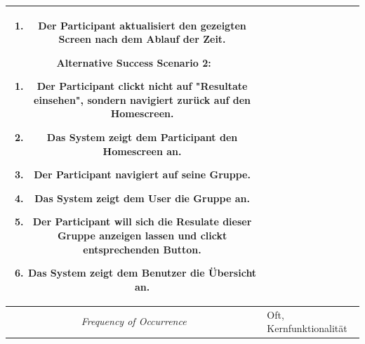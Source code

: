 \begin{center}
\begin{longtable}{| c | p{7cm} |}
\begin{enumerate}[label=1.\alph*,noitemsep]
			\item Der Participant aktualisiert den gezeigten Screen nach dem Ablauf der Zeit.
		\end{enumerate}
		Alternative Success Scenario 2:
		\begin{enumerate}[label=4.\alph*,noitemsep]
			\item Der Participant clickt nicht auf "Resultate einsehen", sondern navigiert zurück auf den Homescreen.
			\item Das System zeigt dem Participant den Homescreen an.
			\item Der Participant navigiert auf seine Gruppe.
			\item Das System zeigt dem User die Gruppe an.
			\item Der Participant will sich die Resulate dieser Gruppe anzeigen lassen und clickt entsprechenden Button.
			\item Das System zeigt dem Benutzer die Übersicht an.
		\end{enumerate}\\
		\hline
		\textit{Frequency of Occurrence} & Oft, Kernfunktionalität\\
		\hline
	\end{longtable}
\end{center}



